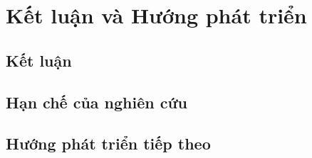 \chapter{Kết luận và Hướng phát triển}
\label{chap:conclusion}

\section{Kết luận}
\label{sec:conclusion:summary}

\section{Hạn chế của nghiên cứu}
\label{sec:conclusion:limitations}

\section{Hướng phát triển tiếp theo}
\label{sec:conclusion:future}
